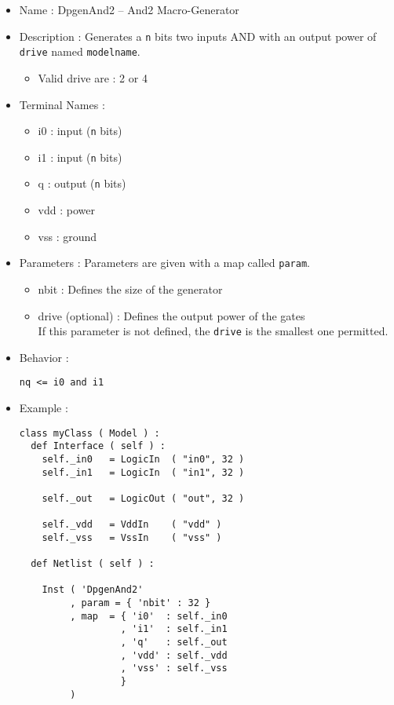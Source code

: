 \begin{itemize}
    \item Name : DpgenAnd2 -- And2 Macro-Generator
    \item Description : Generates a \verb-n- bits two inputs AND with an output power of \verb-drive- named \verb-modelname-.
    \begin{itemize}
        \item Valid drive are : 2 or 4
    \end{itemize}
    \item Terminal Names :
    \begin{itemize}
        \item i0 : input (\verb-n- bits)
        \item i1 : input (\verb-n- bits)
        \item q : output (\verb-n- bits)
        \item vdd : power
        \item vss : ground
    \end{itemize}
    \item Parameters : Parameters are given with a map called \verb-param-.
    \begin{itemize}
        \item nbit : Defines the size of the generator
        \item drive (optional) : Defines the output power of the gates\\If this parameter is not defined, the \verb-drive- is the smallest one permitted.
    \end{itemize}
    \item Behavior :
\begin{verbatim}
nq <= i0 and i1
\end{verbatim}
    \item Example :
\begin{verbatim}
class myClass ( Model ) :
  def Interface ( self ) :
    self._in0   = LogicIn  ( "in0", 32 )
    self._in1   = LogicIn  ( "in1", 32 )
    
    self._out   = LogicOut ( "out", 32 )

    self._vdd   = VddIn    ( "vdd" )
    self._vss   = VssIn    ( "vss" )
    
  def Netlist ( self ) :
      
    Inst ( 'DpgenAnd2'
         , param = { 'nbit' : 32 }
         , map  = { 'i0'  : self._in0
                  , 'i1'  : self._in1
                  , 'q'   : self._out
                  , 'vdd' : self._vdd
                  , 'vss' : self._vss
                  }
         )
\end{verbatim}
\end{itemize}
